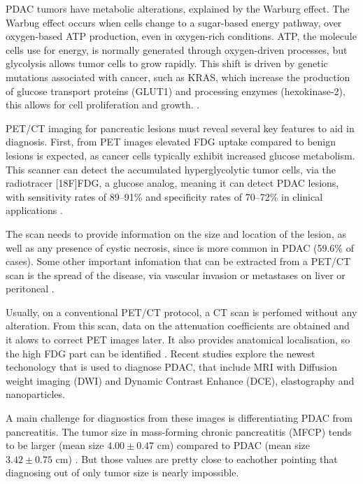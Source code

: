 PDAC tumors have metabolic alterations, explained by the Warburg effect.\cite{Hammond2024} The Warbug effect occurs when cells change to a sugar-based energy pathway, over oxygen-based ATP production, even in oxygen-rich conditions. ATP, the molecule cells use for energy, is normally generated through oxygen-driven processes, but glycolysis allows tumor cells to grow rapidly. This shift is driven by genetic mutations associated with cancer, such as KRAS, which increase the production of glucose transport proteins (GLUT1) and processing enzymes (hexokinase-2), this allows for cell proliferation and growth. \cite{Pubmed30721664, Pu2021}.


PET/CT imaging for pancreatic lesions must reveal several key features to aid in diagnosis. First, from PET images elevated FDG uptake compared to benign lesions is expected, as cancer cells typically exhibit increased glucose metabolism. This scanner can detect the accumulated hyperglycolytic tumor cells, via the radiotracer [18F]FDG, a glucose analog, meaning it can detect PDAC lesions, with sensitivity rates of 89–91\% and specificity rates of 70–72\% in clinical applications \cite{Pu2021}.

The scan needs to provide information on the size and location of the lesion, as well as any presence of cystic necrosis, since is more common in PDAC (59.6\% of cases). Some other important infomation that can be extracted from a PET/CT scan is the spread of the disease, via vascular invasion or metastases on liver or peritoneal \cite{parikh2020fdg}.  

Usually, on a conventional PET/CT protocol, a CT scan is perfomed without any alteration. From this scan, data on the attenuation coefficients are obtained and it alows to correct PET images later. It also provides anatomical localisation, so the high FDG part can be identified \cite{benamor2007petct}. Recent studies explore the newest techonology that is used to diagnose PDAC, that include MRI with Diffusion weight imaging (DWI) and Dynamic Contrast Enhance (DCE), elastography and nanoparticles. \cite{Cancers2023}


A main challenge for diagnostics from these images is differentiating PDAC from pancreatitis. The tumor size in mass-forming chronic pancreatitis (MFCP) tends to be larger (mean size $4.00 \pm 0.47$ cm) compared to PDAC (mean size $3.42 \pm 0.75$ cm) \cite{arnone2020}. But those values are pretty close to eachother pointing that diagnosing out of only tumor size is nearly impossible. 

